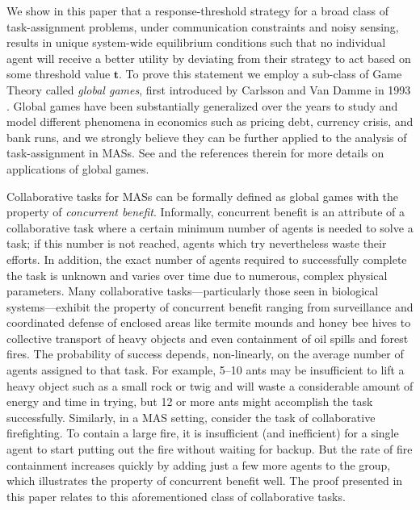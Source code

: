 \documentclass[conference]{ieeeconf}
\def\td{\mathbf{t}}   %
\begin{document}
We show in this paper that a response-threshold strategy for a broad class of task-assignment problems, under communication constraints  and noisy sensing, results in unique system-wide equilibrium conditions such that no individual agent will receive a better utility by deviating from their strategy to act based on some threshold value $\td$. To prove this statement we employ a sub-class of Game Theory called \emph{global games}, first introduced by Carlsson and Van Damme in 1993 \cite{Carlsson1993}. Global games have been substantially generalized over the years to study and model different phenomena in economics such as pricing debt, currency crisis, and bank runs, and we strongly believe they can be further applied to the analysis of task-assignment in MASs. See \cite{Morris2000} and the references therein for more details on applications of global games.

Collaborative tasks for MASs can be formally defined as global games with the property of \emph{concurrent benefit}. Informally, concurrent benefit is an attribute of a collaborative task where a certain minimum number of agents is needed to solve a task; if this number is not reached, agents which try nevertheless waste their efforts. In addition, the exact number of agents required to successfully complete the task is unknown and varies over time due to numerous, complex physical parameters. Many collaborative tasks---particularly those seen in biological systems---exhibit the property of concurrent benefit ranging from surveillance and coordinated defense of enclosed areas like termite mounds and honey bee hives \cite{Breed1990} to collective transport of heavy objects and even containment of oil spills and forest fires. The probability of success depends, non-linearly, on the average number of agents assigned to that task. For example, 5--10 ants may be insufficient to lift a heavy object such as a small rock or twig and will waste a considerable amount of energy and time in trying, but 12 or more ants might accomplish the task successfully. Similarly, in a MAS setting, consider the task of collaborative firefighting. To contain a large fire, it is insufficient (and inefficient) for a single agent to start putting out the fire without waiting for backup. But the rate of fire containment increases quickly by adding just a few more agents to the group, which illustrates the property of concurrent benefit well. The proof presented in this paper relates to this aforementioned class of collaborative tasks.
\end{document}
